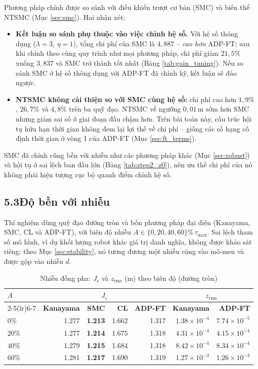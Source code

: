 \documentclass[12pt,a4paper]{article}
\makeatletter
\newcommand{\seclabel}[2]{\phantomsection\protected@edef\@currentlabel{#2}\label{#1}}
\makeatother
\begin{document}
Phương pháp chính được so sánh với điều khiển trượt cơ bản (SMC) và biến thể NTSMC (Mục \ref{sec:smc}). Hai nhận xét:
\begin{itemize}
    \item \textbf{Kết luận so sánh phụ thuộc vào việc chỉnh hệ số.} Với hệ số thông dụng ($\lambda = 3$, $\eta = 1$), tổng chi phí của SMC là $4{,}887$ -- \textit{cao hơn} ADP-FT; sau khi chỉnh theo cùng quy trình như mọi phương pháp, chi phí giảm $21{,}5\%$ xuống $3{,}837$ và SMC trở thành tốt nhất (Bảng \ref{tab:gain_tuning}). Nếu so sánh SMC ở hệ số thông dụng với ADP-FT đã chỉnh kỹ, kết luận sẽ đảo ngược.
    \item \textbf{NTSMC không cải thiện so với SMC cùng hệ số:} chi phí cao hơn $1{,}9\%$, $26{,}7\%$ và $4{,}8\%$ trên ba quỹ đạo. NTSMC về ngưỡng $0{,}01$\,m sớm hơn SMC nhưng giảm sai số ở giai đoạn đầu chậm hơn. Trên bài toán này, cấu trúc hội tụ hữu hạn thời gian không đem lại lợi thế về chi phí -- giống các số hạng cố định thời gian ở vòng 1 của ADP-FT (Mục \ref{sec:ft_terms}).
\end{itemize}
SMC đã chỉnh cũng bền với nhiễu như các phương pháp khác (Mục \ref{sec:robust}) và hội tụ ở sai lệch ban đầu lớn (Bảng \ref{tab:step2_z0}), nên ưu thế chi phí của nó không phải hiện tượng cục bộ quanh điểm chỉnh hệ số.

\subsection*{5.3\quad Độ bền với nhiễu}
\seclabel{sec:robust}{5.3}

Thí nghiệm dùng quỹ đạo đường tròn và bốn phương pháp đại diện (Kanayama, SMC, CL và ADP-FT), với biên độ nhiễu $A \in \{0, 20, 40, 60\}\%\,\tau_\text{max}$. Sai lệch tham số mô hình, ví dụ khối lượng robot khác giá trị danh nghĩa, không được khảo sát riêng: theo Mục \ref{sec:stability}, nó tương đương một nhiễu cộng vào mô-men và được gộp vào nhiễu $d$.

\begin{table}[H]
\centering
\caption{Nhiễu đồng pha: $J_c$ và $z_\text{rms}$ (m) theo biên độ (đường tròn)}
\label{tab:dist_robust}
\small
\begin{tabular}{lrrrrrr}
\toprule
\multirow{2}{*}{$A$} & \multicolumn{4}{c}{$J_c$} & \multicolumn{2}{c}{$z_\text{rms}$} \\
\cmidrule(lr){2-5}\cmidrule(lr){6-7}
 & \textbf{Kanayama} & \textbf{SMC} & \textbf{CL} & \textbf{ADP-FT} & \textbf{Kanayama} & \textbf{ADP-FT} \\
\midrule
$0\%$ & 1.277 & \textbf{1.213} & 1.662 & 1.317 & $1.38\times10^{-4}$ & $7.74\times10^{-5}$ \\
$20\%$ & 1.277 & \textbf{1.214} & 1.675 & 1.318 & $4.31\times10^{-4}$ & $4.15\times10^{-4}$ \\
$40\%$ & 1.279 & \textbf{1.215} & 1.684 & 1.318 & $8.42\times10^{-4}$ & $8.34\times10^{-4}$ \\
$60\%$ & 1.281 & \textbf{1.217} & 1.690 & 1.319 & $1.27\times10^{-3}$ & $1.26\times10^{-3}$ \\
\bottomrule
\end{tabular}
\end{table}
\end{document}
